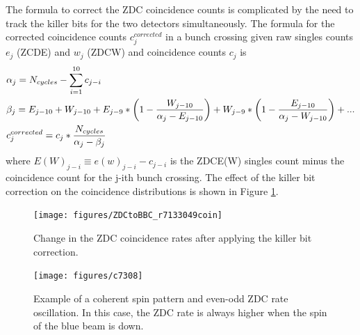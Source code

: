The formula to correct the ZDC coincidence counts is complicated by the need to
track the killer bits for the two detectors simultaneously. The formula for the
corrected coincidence counts \(c_{j}^{corrected}\) in a bunch crossing given raw
singles counts \(e_{j}\) (ZCDE) and \(w_{j}\) (ZDCW) and coincidence counts
\(c_{j}\) is
%
\begin{align}
  &\alpha_{j} = N_{cycles} - \sum_{i=1}^{10}c_{j-i} \notag\\
  &\beta_{j} = E_{j-10} + W_{j-10} + E_{j-9}*\left(1 - \frac{W_{j-10}}{\alpha_{j} - E_{j-10}}\right) + W_{j-9}*\left(1 - \frac{E_{j-10}}{\alpha_{j} - W_{j-10}}\right) + ...\notag\\
  &c_{j}^{corrected} = c_{j} * \frac{N_{cycles}}{\alpha_{j} - \beta_{j}} 
\end{align}
%
where \(E(W)_{j-i} \equiv e(w)_{j-i} - c_{j-i}\) is the ZDCE(W) singles count
minus the coincidence count for the j-ith bunch crossing. The effect of the
killer bit correction on the coincidence distributions is shown in Figure
\ref{fig:coinRat6143016}.

\begin{figure}
  \begin{center}
    \texttt{[image: figures/ZDCtoBBC\_r7133049coin]}
  \end{center}
  \caption{Change in the ZDC coincidence rates after applying the killer bit
  correction.}
  \label{fig:coinRat6143016}
\end{figure}

\begin{figure}
  \begin{center}
    \texttt{[image: figures/c7308]}
  \end{center}
  \caption{Example of a coherent spin pattern and even-odd ZDC rate
  oscillation. In this case, the ZDC rate is always higher when the spin of
  the blue beam is down.}
  \label{fig:c7308}
\end{figure}


